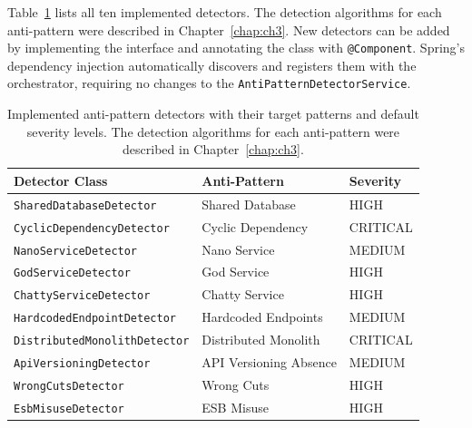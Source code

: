 Table~\ref{tab:detectors} lists all ten implemented detectors. The detection algorithms for each anti-pattern were described in Chapter~\ref{chap:ch3}. New detectors can be added by implementing the interface and annotating the class with \texttt{@Component}. Spring's dependency injection automatically discovers and registers them with the orchestrator, requiring no changes to the \texttt{AntiPatternDetectorService}.

\begin{table}[htbp]
    \centering
    \footnotesize
    \begin{tabular}{|l|l|l|}
        \hline
        \textbf{Detector Class}              & \textbf{Anti-Pattern}  & \textbf{Severity} \\
        \hline\hline
        \texttt{SharedDatabaseDetector}      & Shared Database        & HIGH              \\
        \hline
        \texttt{CyclicDependencyDetector}    & Cyclic Dependency      & CRITICAL          \\
        \hline
        \texttt{NanoServiceDetector}         & Nano Service           & MEDIUM            \\
        \hline
        \texttt{GodServiceDetector}          & God Service            & HIGH              \\
        \hline
        \texttt{ChattyServiceDetector}       & Chatty Service         & HIGH              \\
        \hline
        \texttt{HardcodedEndpointDetector}   & Hardcoded Endpoints    & MEDIUM            \\
        \hline
        \texttt{DistributedMonolithDetector} & Distributed Monolith   & CRITICAL          \\
        \hline
        \texttt{ApiVersioningDetector}       & API Versioning Absence & MEDIUM            \\
        \hline
        \texttt{WrongCutsDetector}           & Wrong Cuts             & HIGH               \\
        \hline
        \texttt{EsbMisuseDetector}           & ESB Misuse             & HIGH                \\
        \hline
    \end{tabular}
    \caption{Implemented anti-pattern detectors with their target patterns and default severity levels. The detection algorithms for each anti-pattern were described in Chapter~\ref{chap:ch3}.}
    \label{tab:detectors}
\end{table}

